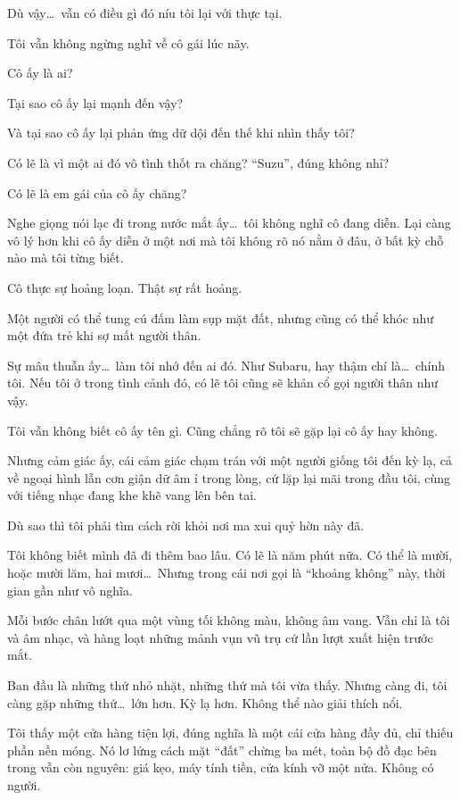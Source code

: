 \documentclass[../main.tex]{subfiles}
\begin{document}
Dù vậy\dots\ vẫn có điều gì đó níu tôi lại với thực tại.

Tôi vẫn không ngừng nghĩ về cô gái lúc nãy.

Cô ấy là ai?

Tại sao cô ấy lại mạnh đến vậy?

Và tại sao cô ấy lại phản ứng dữ dội đến thế khi nhìn thấy tôi?

Có lẽ là vì một ai đó vô tình thốt ra chăng? ``Suzu'', đúng không nhỉ?

Có lẽ là em gái của cô ấy chăng?

Nghe giọng nói lạc đi trong nước mắt ấy\dots\ tôi không nghĩ cô đang diễn. Lại càng vô lý hơn khi cô ấy diễn ở một nơi mà tôi không rõ nó nằm ở đâu, ở bất kỳ chỗ nào mà tôi từng biết.

Cô thực sự hoảng loạn. Thật sự rất hoảng.

Một người có thể tung cú đấm làm sụp mặt đất, nhưng cũng có thể khóc như một đứa trẻ khi sợ mất người thân.

Sự mâu thuẫn ấy\dots\ làm tôi nhớ đến ai đó. Như Subaru, hay thậm chí là\dots\ chính tôi. Nếu tôi ở trong tình cảnh đó, có lẽ tôi cũng sẽ khản cổ gọi người thân như vậy.

Tôi vẫn không biết cô ấy tên gì. Cũng chẳng rõ tôi sẽ gặp lại cô ấy hay không.

Nhưng cảm giác ấy, cái cảm giác chạm trán với một người giống tôi đến kỳ lạ, cả về ngoại hình lẫn cơn giận dữ âm ỉ trong lòng, cứ lặp lại mãi trong đầu tôi, cùng với tiếng nhạc đang khe khẽ vang lên bên tai.

Dù sao thì tôi phải tìm cách rời khỏi nơi ma xui quỷ hờn này đã.

\ct

Tôi không biết mình đã đi thêm bao lâu. Có lẽ là năm phút nữa. Có thể là mười, hoặc mười lăm, hai mươi\dots\ Nhưng trong cái nơi gọi là ``khoảng không'' này, thời gian gần như vô nghĩa.

Mỗi bước chân lướt qua một vùng tối không màu, không âm vang. Vẫn chỉ là tôi và âm nhạc, và hàng loạt những mảnh vụn vũ trụ cứ lần lượt xuất hiện trước mắt.

Ban đầu là những thứ nhỏ nhặt, những thứ mà tôi vừa thấy. Nhưng càng đi, tôi càng gặp những thứ\dots\ lớn hơn. Kỳ lạ hơn. Không thể nào giải thích nổi.

Tôi thấy một cửa hàng tiện lợi, đúng nghĩa là một cái cửa hàng đầy đủ, chỉ thiếu phần nền móng. Nó lơ lửng cách mặt ``đất'' chừng ba mét, toàn bộ đồ đạc bên trong vẫn còn nguyên: giá kẹo, máy tính tiền, cửa kính vỡ một nửa. Không có người.
\end{document}
